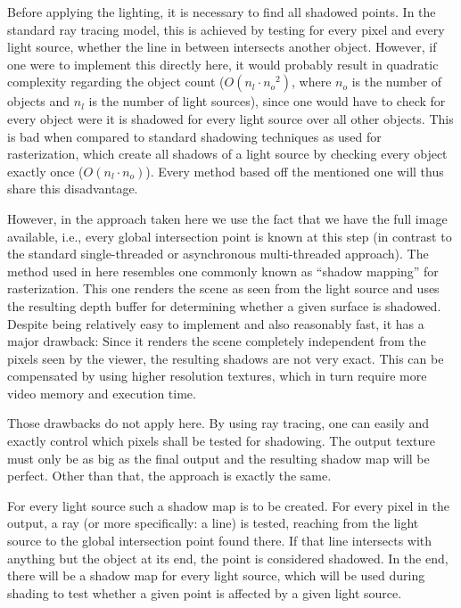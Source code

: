 \documentclass[english,fleqn,10pt,twocolumn]{article}
\begin{document}
Before applying the lighting, it is necessary to find all shadowed points. In the standard ray tracing model, this is achieved by testing for every pixel and every light source, whether the line in between intersects another object.
However, if one were to implement this directly here, it would probably result in quadratic complexity regarding the object count ($O(n_l \cdot {n_o}^2)$, where $n_o$ is the number of objects and $n_l$ is the number of light sources),
since one would have to check for every object were it is shadowed for every light source over all other objects. This is bad when compared to standard shadowing techniques as used for rasterization, which create all shadows of a light
source by checking every object exactly once ($O(n_l \cdot n_o)$). Every method based off the mentioned one will thus share this disadvantage.

However, in the approach taken here we use the fact that we have the full image available, i.e., every global intersection point is known at this step (in contrast to the standard single-threaded or asynchronous multi-threaded
approach). The method used in here resembles one commonly known as “shadow mapping” for rasterization. This one renders the scene as seen from the light source and uses the resulting depth buffer for determining whether a given surface
is shadowed. Despite being relatively easy to implement and also reasonably fast, it has a major drawback: Since it renders the scene completely independent from the pixels seen by the viewer, the resulting shadows are not very exact.
This can be compensated by using higher resolution textures, which in turn require more video memory and execution time.

Those drawbacks do not apply here. By using ray tracing, one can easily and exactly control which pixels shall be tested for shadowing. The output texture must only be as big as the final output and the resulting shadow map will be
perfect. Other than that, the approach is exactly the same.

For every light source such a shadow map is to be created. For every pixel in the output, a ray (or more specifically: a line) is tested, reaching from the light source to the global intersection point found there. If that line
intersects with anything but the object at its end, the point is considered shadowed. In the end, there will be a shadow map for every light source, which will be used during shading to test whether a given point is affected by a given
light source.
\end{document}
